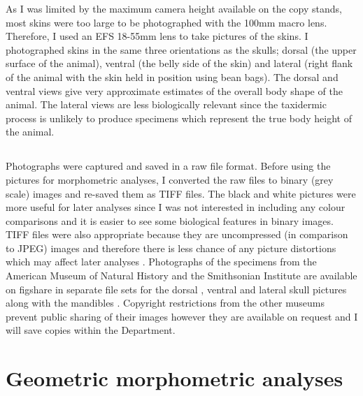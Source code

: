 	As I was limited by the maximum camera height available on the copy stands, most skins were too large to be photographed with the 100mm macro lens. Therefore, I used an EFS 18-55mm lens to take pictures of the skins. I photographed skins in the same three orientations as the skulls; dorsal (the upper surface of the animal), ventral (the belly side of the skin) and lateral (right flank of the animal with the skin held in position using bean bags). The dorsal and ventral views give very approximate estimates of the overall body shape of the animal. The lateral views are less biologically relevant since the taxidermic process is unlikely to produce specimens which represent the true body height of the animal.

\subsection{}
	Photographs were captured and saved in a raw file format. Before using the pictures for morphometric analyses, I converted the raw files to binary (grey scale) images and re-saved them as TIFF files. The black and white pictures were more useful for later analyses since I was not interested in including any colour comparisons and it is easier to see some biological features in binary images. TIFF files were also appropriate because they are uncompressed (in comparison to JPEG) images and therefore there is less chance of any picture distortions which may affect later analyses \citep{HERC2013}.
	Photographs of the specimens from the American Museum of Natural History and the Smithsonian Institute are available on figshare in separate file sets for the dorsal \citep{Finlay2013d}, ventral \citep{Finlay2013v} and lateral \citep{Finlay2013l} skull pictures along with the mandibles \citep{Finlay2013m}. Copyright restrictions from the other museums prevent public sharing of their images however they are available on request and I will save copies within the Department.
	


\section{Geometric morphometric analyses}
\label{sect:morphometrics}

\subsection{}

